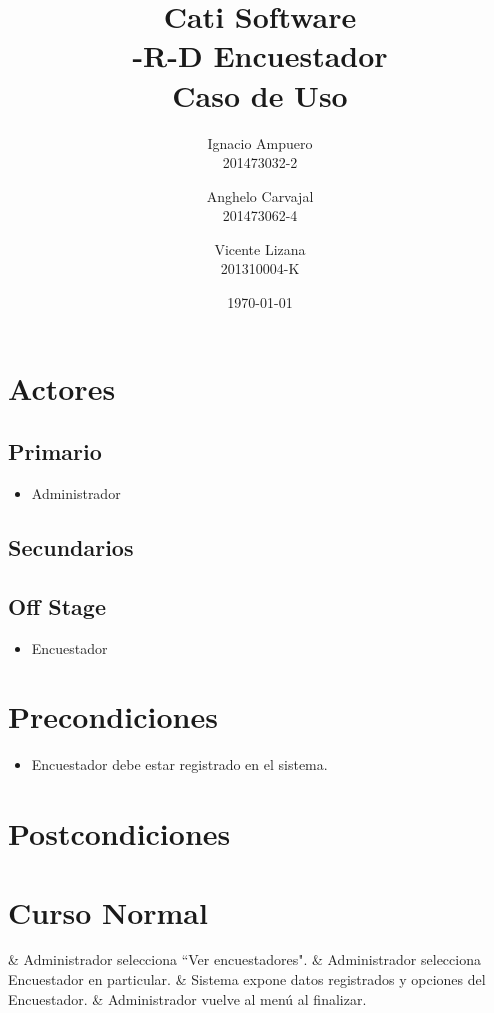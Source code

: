 \documentclass[fleqn]{article}
\title{\huge Cati Software\\ \Huge -R-D Encuestador\\ \Large Caso de Uso \vspace{30pt}}
\author{Ignacio Ampuero\\ 201473032-2 \and Anghelo Carvajal\\ 201473062-4 \and Vicente Lizana\\ 201310004-K}
\date{\today}
\begin{document}
\maketitle
\vspace{30pt}

\section{Actores}

	\subsection{Primario}
	
	\begin{itemize}
		\item Administrador
	\end{itemize}
	
	\subsection{Secundarios}
	
	\subsection{Off Stage}
	
	\begin{itemize}
		\item Encuestador
	\end{itemize}

\section{Precondiciones}

\begin{itemize}
	\item Encuestador debe estar registrado en el sistema.
\end{itemize}

\section{Postcondiciones}

\section{Curso Normal}

\begin{easylist}
	& Administrador selecciona ``Ver encuestadores".
	& Administrador selecciona Encuestador en particular.
	& Sistema expone datos registrados y opciones del Encuestador.
	& Administrador vuelve al menú al finalizar.
\end{easylist}
\end{document}
